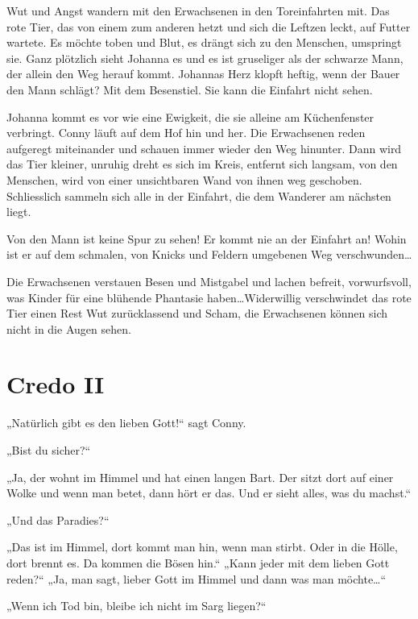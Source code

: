 \documentclass[10pt,titlepage,a5paper]{book}
\begin{document}
Wut und Angst wandern mit den Erwachsenen in den Toreinfahrten mit. Das rote Tier, das von einem zum anderen hetzt und sich die Leftzen leckt, auf Futter wartete. Es möchte toben und Blut, es drängt sich zu den Menschen, umspringt sie. Ganz plötzlich sieht Johanna es und es ist gruseliger als der schwarze Mann, der allein den Weg herauf kommt. Johannas Herz klopft heftig, wenn der Bauer den Mann schlägt? Mit dem Besenstiel. Sie kann die Einfahrt nicht sehen. 

Johanna kommt es vor wie eine Ewigkeit, die sie alleine am Küchenfenster verbringt. Conny läuft auf dem Hof hin und her. Die Erwachsenen reden aufgeregt miteinander und schauen immer wieder den Weg hinunter. Dann wird das  Tier kleiner, unruhig dreht es sich im Kreis, entfernt sich langsam, von den Menschen, wird von einer unsichtbaren Wand von ihnen weg geschoben.
Schliesslich sammeln sich alle in der Einfahrt, die dem Wanderer am nächsten liegt.  

Von den Mann ist keine Spur zu sehen! Er kommt nie an der Einfahrt an!
Wohin ist er auf dem schmalen, von Knicks und Feldern umgebenen Weg verschwunden\dots

Die Erwachsenen verstauen Besen und Mistgabel und lachen befreit, vorwurfsvoll, was Kinder für eine blühende Phantasie haben\dots Widerwillig verschwindet das rote Tier einen Rest Wut zurücklassend und Scham, die Erwachsenen können sich nicht in die Augen sehen.



\section*{Credo II}



„Natürlich gibt es den lieben Gott!“ sagt Conny. 

„Bist du sicher?“

„Ja, der wohnt im Himmel und hat einen langen Bart. Der sitzt dort auf einer Wolke und wenn man betet, dann hört er das. Und er sieht alles, was du machst.“

„Und das Paradies?“  

„Das ist im Himmel, dort kommt man hin, wenn man stirbt. Oder in die Hölle, dort brennt es. Da kommen die Bösen hin.“ 
„Kann jeder mit dem lieben Gott reden?“ „Ja, man sagt, lieber Gott im Himmel und dann was man möchte\dots“


„Wenn ich Tod bin, bleibe ich nicht im Sarg liegen?“
\end{document}
